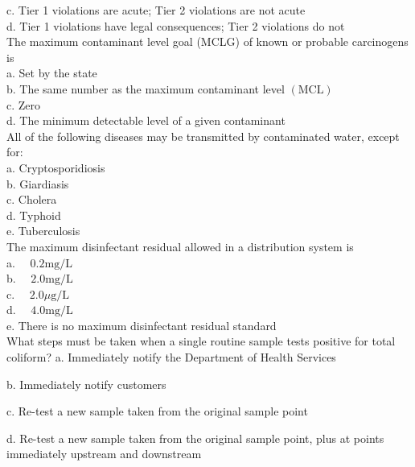 c. Tier 1 violations are acute; Tier 2 violations are not acute\\

d. Tier 1 violations have legal consequences; Tier 2 violations do not\\


The maximum contaminant level goal (MCLG) of known or probable carcinogens is\\
a. Set by the state\\
b. The same number as the maximum contaminant level $(\mathrm{MCL})$\\
c. Zero\\
d. The minimum detectable level of a given contaminant\\

  All of the following diseases may be transmitted by contaminated water, except for:\\


a. Cryptosporidiosis\\

b. Giardiasis\\

c. Cholera\\

d. Typhoid\\

e. Tuberculosis\\


The maximum disinfectant residual allowed in a distribution system is\\

a. $\quad 0.2 \mathrm{mg} / \mathrm{L}$\\

b. $\quad 2.0 \mathrm{mg} / \mathrm{L}$\\

c. $\quad 2.0 \mu \mathrm{g} / \mathrm{L}$\\

d. $\quad 4.0 \mathrm{mg} / \mathrm{L}$\\

e. There is no maximum disinfectant residual standard\\

What steps must be taken when a single routine sample tests positive for total coliform?
a. Immediately notify the Department of Health Services

b. Immediately notify customers

c. Re-test a new sample taken from the original sample point

d. Re-test a new sample taken from the original sample point, plus at points immediately upstream and downstream

